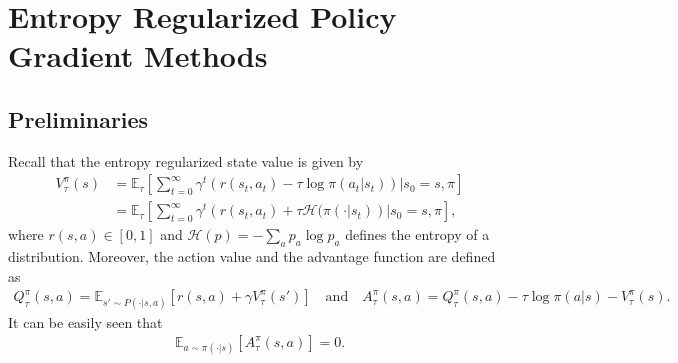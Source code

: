\section{Entropy Regularized Policy Gradient Methods}
\label{sec:entropy}
\subsection{Preliminaries}
Recall that the entropy regularized state value is given by 
\begin{align*}
V^\pi_\tau(s) & = \mathbb{E}_\tau\left[\sum_{t=0}^\infty \gamma^t\left({r(s_t,a_t)-\tau \log \pi(a_t|s_t)}\right)|s_0=s,\pi\right]\\
&= \mathbb{E}_\tau\left[\sum_{t=0}^\infty \gamma^t\left(r(s_t,a_t)+\tau \mathcal{H}(\pi(\cdot|s_t)\right)|s_0=s,\pi\right],
\end{align*}
where $r(s,a)\in[0,1]$ and $\mathcal{H}(p)=-\sum_ap_a\log p_a$ defines the entropy of a distribution. Moreover, the action value and the advantage function  are  defined as 
\begin{align*}
Q_\tau^\pi(s,a)=\mathbb{E}_{s'\sim P(\cdot|s,a)}\left[r(s,a)+\gamma V^\pi_\tau(s')\right]\quad\mbox{and}\quad A_\tau^\pi(s,a) = Q^\pi_\tau(s,a)-\tau\log\pi(a|s)-V_\tau^\pi(s).
\end{align*}
It can be easily seen that 
\begin{align*}\mathbb{E}_{a\sim\pi(\cdot|s)}[A^\pi_\tau(s,a)]=0.
\end{align*}


